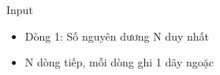 Input
\begin{itemize}
	\item     Dòng 1: Số nguyên dương N duy nhất   
	\item     N dòng tiếp, mỗi dòng ghi 1 dãy ngoặc   
\end{itemize}
